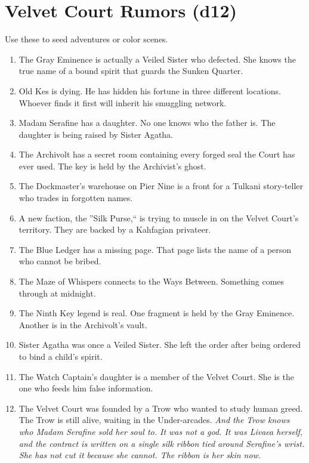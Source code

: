 \documentclass[10pt,twoside]{book}
\begin{document}
\chapter{Velvet Court Rumors (d12)}
Use these to seed adventures or color scenes.

\begin{enumerate}
\item The Gray Eminence is actually a Veiled Sister who defected. She knows the true name of a bound spirit that guards the Sunken Quarter.
\item Old Kes is dying. He has hidden his fortune in three different locations. Whoever finds it first will inherit his smuggling network.
\item Madam Serafine has a daughter. No one knows who the father is. The daughter is being raised by Sister Agatha.
\item The Archivolt has a secret room containing every forged seal the Court has ever used. The key is held by the Archivist's ghost.
\item The Dockmaster's warehouse on Pier Nine is a front for a Tulkani story-teller who trades in forgotten names.
\item A new faction, the ''Silk Purse,`` is trying to muscle in on the Velvet Court's territory. They are backed by a Kahfagian privateer.
\item The Blue Ledger has a missing page. That page lists the name of a person who cannot be bribed.
\item The Maze of Whispers connects to the Ways Between. Something comes through at midnight.
\item The Ninth Key legend is real. One fragment is held by the Gray Eminence. Another is in the Archivolt's vault.
\item Sister Agatha was once a Veiled Sister. She left the order after being ordered to bind a child's spirit.
\item The Watch Captain's daughter is a member of the Velvet Court. She is the one who feeds him false information.
\item The Velvet Court was founded by a Trow who wanted to study human greed. The Trow is still alive, waiting in the Under-arcades. \textit{And the Trow knows who Madam Serafine sold her soul to. It was not a god. It was Livaea herself, and the contract is written on a single silk ribbon tied around Serafine's wrist. She has not cut it because she cannot. The ribbon is her skin now.}
\end{enumerate}
\end{document}
